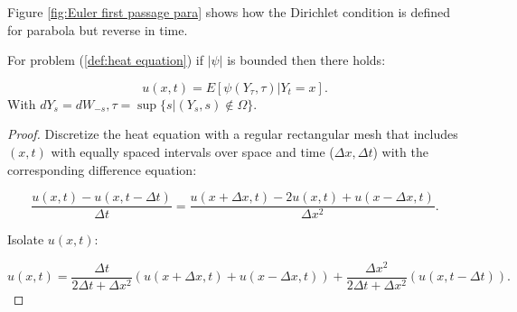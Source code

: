 \documentclass[a4paper,12pt]{article}
\begin{document}
Figure \ref{fig:Euler first passage para} shows how the Dirichlet condition
is defined for parabola but reverse in time.


\begin{lemma} \label{lem:BM HE}
    For problem (\ref{def:heat equation}) if $ |\psi|$ is bounded
    then there holds:

    \begin{equation}
        u(x,t)=E[\psi(Y_{\tau},\tau) | Y_{t} =x].
    \end{equation}
    With $dY_{s} = dW_{-s},\tau = \sup\{s | (Y_{s},s) \notin \Omega\}$.
\end{lemma}


\begin{proof} \label{proof: BM HE }
    Discretize the heat equation
    with a regular rectangular mesh that includes $(x,t)$ with equally
    spaced intervals over space and time ($\Delta x, \Delta t$) with
    the corresponding difference equation:

    \begin{equation}
        \frac{u(x,t)-u(x,t-\Delta t)}{\Delta t} = \frac{u(x + \Delta x,t)-2 u(x,t) +u(x - \Delta x,t)}{\Delta x^{2}} .
    \end{equation}

    Isolate $u(x,t)$:

    \begin{equation} \label{eq:discrete iso heat equation}
        u(x,t) =
        \frac{\Delta t}{ 2 \Delta t + \Delta x^{2}}
        \left(
        u(x+\Delta x,t)+u(x-\Delta x,t)
        \right) +
        \frac{\Delta x^{2}}{ 2 \Delta t + \Delta x^{2}}
        \left(
        u(x,t-\Delta t)
        \right).
    \end{equation}


\end{proof}
\end{document}
